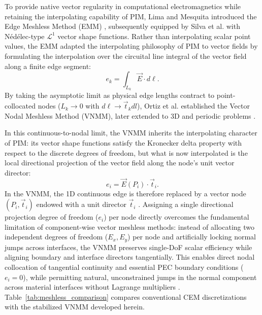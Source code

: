 \documentclass[preprint,12pt]{elsarticle}
\begin{document}
To provide native vector regularity in computational electromagnetics while retaining the interpolating capability of PIM, Lima and Mesquita introduced the Edge Meshless Method (EMM) \cite{lima2017edge}, subsequently equipped by Silva et al. \cite{silva2018new} with N\'ed\'elec-type $\mathcal{L}^1$ vector shape functions. Rather than interpolating scalar point values, the EMM adapted the interpolating philosophy of PIM to vector fields by formulating the interpolation over the circuital line integral of the vector field along a finite edge segment:
\begin{equation}
    e_k = \int_{L_k} \vec{E} \cdot d\boldsymbol{\ell}.
    \label{eq:emm_circulation_dof}
\end{equation}
By taking the asymptotic limit as physical edge lengths contract to point-collocated nodes ($L_k \to 0$ with $d\boldsymbol{\ell} \to \vec{t}_k dl$), Ortiz et al. \cite{ortiz2021creating, ortiz2021nodal, ortiz2023tese} established the Vector Nodal Meshless Method (VNMM), later extended to 3D and periodic problems \cite{goncalves2023vector, goncalves2025tese, goncalves2026periodic}.

In this continuous-to-nodal limit, the VNMM inherits the interpolating character of PIM: its vector shape functions satisfy the Kronecker delta property with respect to the discrete degrees of freedom, but what is now interpolated is the local directional projection of the vector field along the node's unit vector director:
\begin{equation}
    e_i = \vec{E}(P_i) \cdot \vec{t}_i.
    \label{eq:vnmm_projection_dof}
\end{equation}
In the VNMM, the 1D continuous edge is therefore replaced by a vector node $(P_i, \vec{t}_i)$ endowed with a unit director $\vec{t}_i$ \cite{ortiz2021nodal, ortiz2023tese}. Assigning a single directional projection degree of freedom ($e_i$) per node directly overcomes the fundamental limitation of component-wise vector meshless methods: instead of allocating two independent degrees of freedom ($E_x, E_y$) per node and artificially locking normal jumps across interfaces, the VNMM preserves single-DoF scalar efficiency while aligning boundary and interface directors tangentially. This enables direct nodal collocation of tangential continuity and essential PEC boundary conditions ($e_i = 0$), while permitting natural, unconstrained jumps in the normal component across material interfaces without Lagrange multipliers \cite{ortiz2021nodal, goncalves2025tese}. Table~\ref{tab:meshless_comparison} compares conventional CEM discretizations with the stabilized VNMM developed herein.
\end{document}
